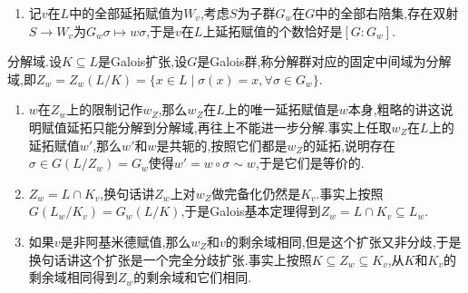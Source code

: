\begin{enumerate}
\begin{proof}
		首先我们断言如果$\sigma\in G$,那么$\sigma\in G_w(L/K)$当且仅当$\sigma$在$w$赋值下是连续映射:必要性因为$|\sigma(x)|_w=|x|_w$自然得到$\sigma$连续,充分性要说明如果$\sigma$满足$w\circ\sigma$不等价于$w$,那么$\sigma$不是连续的.如果它是连续的,那么$|x|_w<1$推出$x^n\to0$,连续性导致$\sigma(x)^n\to0$,导致$|\sigma(x)|_w<1$,于是$w$和$\sigma w$是等价的.
		
		现在$L\subseteq L_w$是稠密的,于是赋值$w$上的连续映射$\sigma$唯一的提升为$L_w$上的连续映射.反过来$G(L_w/K_v)$中的映射限制到$L$上落在$G_w(L/K)$中,于是得到$G_w(L/K)\cong G(L_w/K_v)$.
	\end{proof}
	\item 记$v$在$L$中的全部延拓赋值为$W_v$,考虑$S$为子群$G_w$在$G$中的全部右陪集,存在双射$S\to W_v$为$G_w\sigma\mapsto w\sigma$,于是$v$在$L$上延拓赋值的个数恰好是$[G:G_w]$.
\end{enumerate}

分解域.设$K\subseteq L$是Galois扩张,设$G$是Galois群,称分解群对应的固定中间域为分解域,即$Z_w=Z_w(L/K)=\{x\in L\mid\sigma(x)=x,\forall\sigma\in G_w\}$.
\begin{enumerate}
	\item $w$在$Z_w$上的限制记作$w_Z$,那么$w_Z$在$L$上的唯一延拓赋值是$w$本身,粗略的讲这说明赋值延拓只能分解到分解域,再往上不能进一步分解.事实上任取$w_Z$在$L$上的延拓赋值$w'$,那么$w'$和$w$是共轭的,按照它们都是$w_Z$的延拓,说明存在$\sigma\in G(L/Z_w)=G_w$使得$w'=w\circ\sigma\sim w$,于是它们是等价的.
	\item $Z_w=L\cap K_v$,换句话讲$Z_w$上对$w_Z$做完备化仍然是$K_v$.事实上按照$G(L_w/K_v)=G_w(L/K)$,于是Galois基本定理得到$Z_w=L\cap K_v\subseteq L_w$.
	\item 如果$v$是非阿基米德赋值,那么$w_Z$和$v$的剩余域相同,但是这个扩张又非分歧,于是换句话讲这个扩张是一个完全分歧扩张.事实上按照$K\subseteq Z_w\subseteq K_v$,从$K$和$K_v$的剩余域相同得到$Z_w$的剩余域和它们相同.
\end{enumerate}

